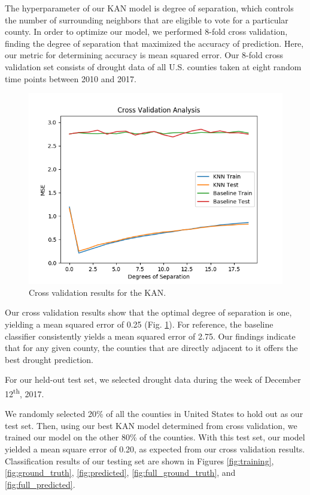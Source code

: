 \documentclass{article}
\begin{document}
The hyperparameter of our KAN model is degree of separation, which controls the number of surrounding neighbors that are eligible to vote for a particular county. In order to optimize our model, we performed 8-fold cross validation, finding the degree of separation that maximized the accuracy of prediction. Here, our metric for determining accuracy is mean squared error. Our 8-fold cross validation set consists of drought data of all U.S. counties taken at eight random time points between 2010 and 2017. 

\begin{figure}[hbt!]
    \centering
    \includegraphics[width = 0.8 \textwidth]{CV_knn.png}
    \caption{Cross validation results for the KAN.}
    \label{fig:CV}
\end{figure}

Our cross validation results show that the  optimal degree of separation is one, yielding a mean squared error of 0.25 (Fig. \ref{fig:CV}). For reference, the baseline classifier consistently yields a mean squared error of 2.75. Our findings indicate that for any given county, the counties that are directly adjacent to it offers the best drought prediction.

For our held-out test set, we selected drought data during the week of December 12\textsuperscript{th}, 2017. 

We randomly selected 20\% of all the counties in United States to hold out as our test set. Then, using our best KAN model determined from 
cross validation, we trained our model on the other 80\% of the counties. With this test set, our model yielded a mean square error of 0.20, as expected from our cross validation results. 
Classification results of our testing set are shown in Figures \ref{fig:training}, \ref{fig:ground_truth}, \ref{fig:predicted}, \ref{fig:full_ground_truth}, and  \ref{fig:full_predicted}.
\end{document}
